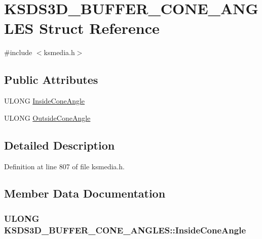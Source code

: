 \hypertarget{struct_k_s_d_s3_d___b_u_f_f_e_r___c_o_n_e___a_n_g_l_e_s}{}\section{K\+S\+D\+S3\+D\+\_\+\+B\+U\+F\+F\+E\+R\+\_\+\+C\+O\+N\+E\+\_\+\+A\+N\+G\+L\+ES Struct Reference}
\label{struct_k_s_d_s3_d___b_u_f_f_e_r___c_o_n_e___a_n_g_l_e_s}


{\ttfamily \#include $<$ksmedia.\+h$>$}

\subsection*{Public Attributes}
\begin{DoxyCompactItemize}
\item 
U\+L\+O\+NG \hyperlink{struct_k_s_d_s3_d___b_u_f_f_e_r___c_o_n_e___a_n_g_l_e_s_aef7ad0d782b1363eb336f30e9a210ced}{Inside\+Cone\+Angle}
\item 
U\+L\+O\+NG \hyperlink{struct_k_s_d_s3_d___b_u_f_f_e_r___c_o_n_e___a_n_g_l_e_s_a8d8835bd0e405ce81cbf83ab188c0c9d}{Outside\+Cone\+Angle}
\end{DoxyCompactItemize}


\subsection{Detailed Description}


Definition at line 807 of file ksmedia.\+h.



\subsection{Member Data Documentation}
\subsubsection[{\texorpdfstring{Inside\+Cone\+Angle}{InsideConeAngle}}]{\setlength{\rightskip}{0pt plus 5cm}U\+L\+O\+NG K\+S\+D\+S3\+D\+\_\+\+B\+U\+F\+F\+E\+R\+\_\+\+C\+O\+N\+E\+\_\+\+A\+N\+G\+L\+E\+S\+::\+Inside\+Cone\+Angle}\hypertarget{struct_k_s_d_s3_d___b_u_f_f_e_r___c_o_n_e___a_n_g_l_e_s_aef7ad0d782b1363eb336f30e9a210ced}{}\label{struct_k_s_d_s3_d___b_u_f_f_e_r___c_o_n_e___a_n_g_l_e_s_aef7ad0d782b1363eb336f30e9a210ced}


